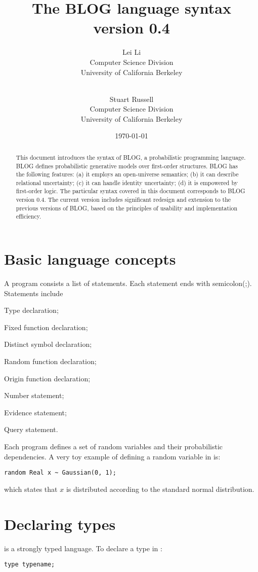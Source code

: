 \documentclass[12pt]{article}
\title{The BLOG language syntax \\ {version 0.4}}
\author{Lei Li\\
              Computer Science Division\\
              University of California Berkeley\\
               \email{leili@cs.berkeley.edu}\\
\and
               Stuart Russell\\
              Computer Science Division\\
              University of California Berkeley\\
               \email{russell@cs.berkeley.edu}
               }
\date{\today}
\begin{document}
\maketitle


\begin{abstract}
This document introduces the syntax of BLOG, a probabilistic programming language. 
BLOG defines probabilistic generative models over first-order structures. 
BLOG has the following features: 
(a) it employs an open-universe semantics;
(b) it can describe relational uncertainty;
(c) it can handle identity uncertainty;
(d) it is empowered by first-order logic.
The particular syntax covered in this document corresponds to BLOG version 0.4. The current version  includes significant redesign and extension to the previous versions of BLOG, based on the principles of  usability and  implementation efficiency. 
\end{abstract}


\tableofcontents

\section{Basic language concepts}
A \bl program consists a list of statements.
Each statement ends with semicolon(;).
Statements include 
\begin{enumerate*}
\item Type declaration;
\item Fixed function declaration;
\item Distinct symbol declaration;
\item Random function declaration;
\item Origin function declaration;
\item Number statement;
\item Evidence statement;
\item Query statement.
\end{enumerate*}

Each \bl program defines a set of random variables and their probabilistic dependencies. 
A very toy example of defining a random variable in \bl is:
\begin{verbatim}
random Real x ~ Gaussian(0, 1);
\end{verbatim}
which states that $x$ is distributed according to the standard normal distribution. 

\section{Declaring types}
\bl is a strongly typed language. To declare a type in \bl:
\begin{verbatim}
type typename;
\end{verbatim}
\end{document}
